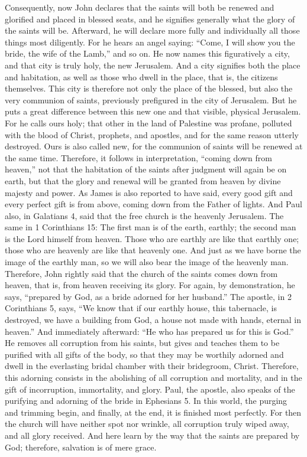 Consequently, now John declares that the saints will both be renewed and glorified and placed in blessed seats, and he signifies generally what the glory of the saints will be. Afterward, he will declare more fully and individually all those things most diligently. For he hears an angel saying: “Come, I will show you the bride, the wife of the Lamb,” and so on. He now names this figuratively a city, and that city is truly holy, the new Jerusalem. And a city signifies both the place and habitation, as well as those who dwell in the place, that is, the citizens themselves. This city is therefore not only the place of the blessed, but also the very communion of saints, previously prefigured in the city of Jerusalem. But he puts a great difference between this new one and that visible, physical Jerusalem. For he calls ours holy; that other in the land of Palestine was profane, polluted with the blood of Christ, prophets, and apostles, and for the same reason utterly destroyed. Ours is also called new, for the communion of saints will be renewed at the same time. Therefore, it follows in interpretation, “coming down from heaven,” not that the habitation of the saints after judgment will again be on earth, but that the glory and renewal will be granted from heaven by divine majesty and power. As James is also reported to have said, every good gift and every perfect gift is from above, coming down from the Father of lights. And Paul also, in Galatians 4, said that the free church is the heavenly Jerusalem. The same in 1 Corinthians 15: The first man is of the earth, earthly; the second man is the Lord himself from heaven. Those who are earthly are like that earthly one; those who are heavenly are like that heavenly one. And just as we have borne the image of the earthly man, so we will also bear the image of the heavenly man. Therefore, John rightly said that the church of the saints comes down from heaven, that is, from heaven receiving its glory. For again, by demonstration, he says, “prepared by God, as a bride adorned for her husband.” The apostle, in 2 Corinthians 5, says, “We know that if our earthly house, this tabernacle, is destroyed, we have a building from God, a house not made with hands, eternal in heaven.” And immediately afterward: “He who has prepared us for this is God.” He removes all corruption from his saints, but gives and teaches them to be purified with all gifts of the body, so that they may be worthily adorned and dwell in the everlasting bridal chamber with their bridegroom, Christ. Therefore, this adorning consists in the abolishing of all corruption and mortality, and in the gift of incorruption, immortality, and glory. Paul, the apostle, also speaks of the purifying and adorning of the bride in Ephesians 5. In this world, the purging and trimming begin, and finally, at the end, it is finished most perfectly. For then the church will have neither spot nor wrinkle, all corruption truly wiped away, and all glory received. And here learn by the way that the saints are prepared by God; therefore, salvation is of mere grace.

